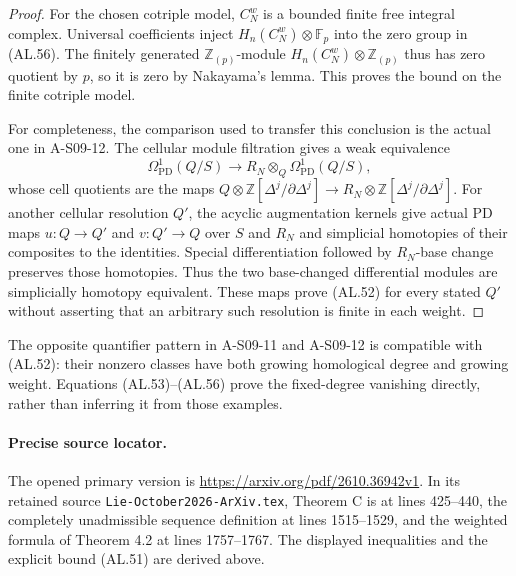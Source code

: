 \begin{proof}
For the chosen cotriple model, $C_N^w$ is a bounded
finite free integral complex.  Universal coefficients
inject $H_n(C_N^w)\otimes\mathbb F_p$ into the
zero group in (AL.56).  The finitely generated
$\mathbb Z_{(p)}$-module
$H_n(C_N^w)\otimes\mathbb Z_{(p)}$ thus has zero
quotient by $p$, so it is zero by Nakayama's lemma.
This proves the bound on the finite cotriple model.

For completeness, the comparison used to transfer
this conclusion is the actual one in A-S09-12.
The cellular module filtration gives a weak
equivalence
\[
 \Omega^1_{\mathrm{PD}}(Q/S)\longrightarrow
               R_N\otimes_Q\Omega^1_{\mathrm{PD}}(Q/S),
\]
whose cell quotients are the maps
$Q\otimes\mathbb Z[\Delta^j/\partial\Delta^j]
\to R_N\otimes\mathbb Z[\Delta^j/\partial\Delta^j]$.
For another cellular resolution $Q'$, the acyclic
augmentation kernels give actual PD maps
$u:Q\to Q'$ and $v:Q'\to Q$ over $S$ and $R_N$
and simplicial homotopies of their composites to
the identities.  Special differentiation followed
by $R_N$-base change preserves those homotopies.
Thus the two base-changed differential modules are
simplicially homotopy equivalent.  These maps prove
(AL.52) for every stated $Q'$ without asserting
that an arbitrary such resolution is finite in
each weight.
\end{proof}

The opposite quantifier pattern in A-S09-11 and
A-S09-12 is compatible with (AL.52): their nonzero
classes have both growing homological degree and
growing weight.  Equations (AL.53)--(AL.56) prove
the fixed-degree vanishing directly, rather than
inferring it from those examples.

\paragraph{Precise source locator.}
The opened primary version is
\url{https://arxiv.org/pdf/2610.36942v1}.
In its retained source
\texttt{Lie-October2026-ArXiv.tex},
Theorem C is at lines 425--440, the completely
unadmissible sequence definition at lines
1515--1529, and the weighted formula of Theorem
4.2 at lines 1757--1767.  The displayed inequalities
and the explicit bound (AL.51) are derived above.
